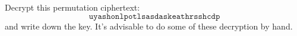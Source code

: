   Decrypt this permutation ciphertext:
  \[
    \texttt{uyashonlpotlsasdaskeathrsshcdp}
  \]
  and write down the key.
  It's advisable to do some of these decryption by hand.
